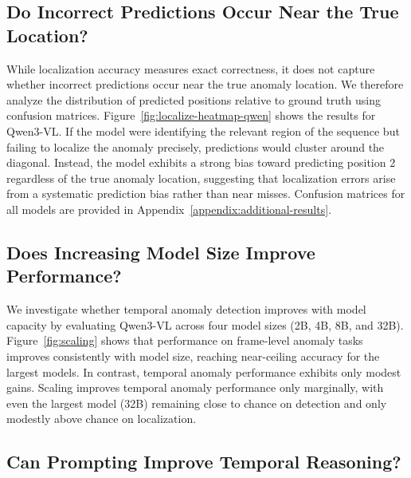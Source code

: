 \documentclass[11pt]{article}
\begin{document}
\subsection{Do Incorrect Predictions Occur Near the True Location?}

While localization accuracy measures exact correctness, it does not capture whether incorrect predictions occur near the true anomaly location. We therefore analyze the distribution of predicted positions relative to ground truth using confusion matrices. Figure~\ref{fig:localize-heatmap-qwen} shows the results for Qwen3-VL. If the model were identifying the relevant region of the sequence but failing to localize the anomaly precisely, predictions would cluster around the diagonal. Instead, the model exhibits a strong bias toward predicting position 2 regardless of the true anomaly location, suggesting that localization errors arise from a systematic prediction bias rather than near misses. Confusion matrices for all models are provided in Appendix~\ref{appendix:additional-results}.

\subsection{Does Increasing Model Size Improve Performance?}

We investigate whether temporal anomaly detection improves with model capacity by evaluating Qwen3-VL across four model sizes (2B, 4B, 8B, and 32B). Figure~\ref{fig:scaling} shows that performance on frame-level anomaly tasks improves consistently with model size, reaching near-ceiling accuracy for the largest models. In contrast, temporal anomaly performance exhibits only modest gains. 
Scaling improves temporal anomaly performance only marginally, with even the largest model (32B) remaining close to chance on detection and only modestly above chance on localization.


\subsection{Can Prompting Improve Temporal Reasoning?}
\end{document}
